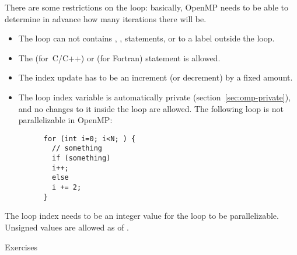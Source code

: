 There are some restrictions on the loop: basically, OpenMP needs to be
able to determine in advance how many iterations there will be.
\begin{itemize}
\item The loop can not contains , ,  statements, or
   to a label outside the loop.
\item The  (for~C/C++)
  or  (for Fortran)
  statement is allowed.
\item The index update has to be an increment (or decrement) by a fixed amount.
\item The loop index variable is automatically private (section~\ref{sec:omp-private}),
  and no changes to it
  inside the loop are allowed.
  The following loop is not parallelizable in OpenMP:
    \begin{lstlisting}
      for (int i=0; i<N; ) {
        // something
        if (something)
        i++;
        else
        i += 2;
      }
    \end{lstlisting}
\end{itemize}

\begin{remark}
  The loop index needs to be an integer value
  for the loop to be parallelizable.
  Unsigned values are allowed as of .
\end{remark}

 {Exercises}

